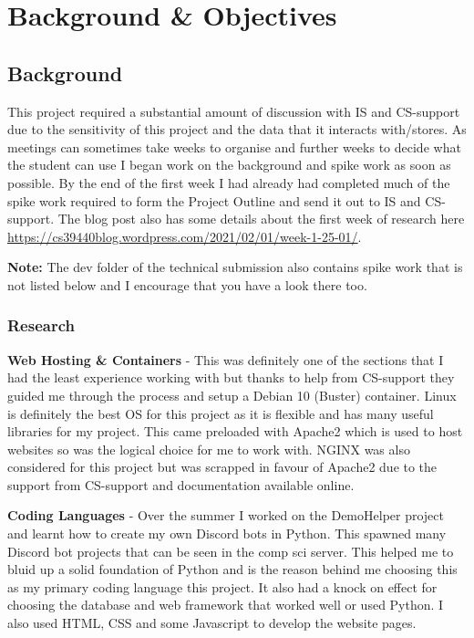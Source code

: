 \chapter{Background \& Objectives} 

\section{Background}

This project required a substantial amount of discussion with IS and CS-support due to the sensitivity of this project and the data that it interacts with/stores. As meetings can sometimes take weeks to organise and further weeks to decide what the student can use I began work on the background and spike work as soon as possible. By the end of the first week I had already had completed much of the spike work required to form the Project Outline and send it out to IS and CS-support. The blog post also has some details about the first week of research here \href{https://cs39440blog.wordpress.com/2021/02/01/week-1-25-01/}{https://cs39440blog.wordpress.com/2021/02/01/week-1-25-01/}.

\textbf{Note:} The dev folder of the technical submission also contains spike work that is not listed below and I encourage that you have a look there too.

\subsection{Research}
\textbf{Web Hosting \& Containers} - This was definitely one of the sections that I had the least experience working with but thanks to help from CS-support they guided me through the process and setup a Debian 10 (Buster) \cite{debian} container. Linux is definitely the best OS for this project as it is flexible and has many useful libraries for my project. This came preloaded with Apache2 \cite{apache2} which is used to host websites so was the logical choice for me to work with. NGINX \cite{nginx} was also considered for this project but was scrapped in favour of Apache2 due to the support from CS-support and documentation available online. 

\textbf{Coding Languages} -  Over the summer I worked on the DemoHelper \cite{demohelper} project and learnt how to create my own Discord bots in Python. This spawned many Discord bot projects that can be seen in the comp sci server. This helped me to bluid up a solid foundation of Python and is the reason behind me choosing this as my primary coding language this project. It also had a knock on effect for choosing the database and web framework that worked well or used Python. I also used HTML, CSS and some Javascript to develop the website pages.

